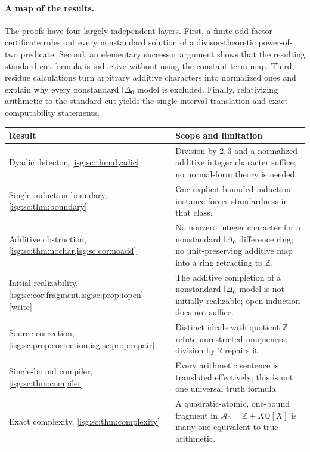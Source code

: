 \documentclass[11pt]{article}
\theoremstyle{definition}
\theoremstyle{remark}
\newcommand{\Z}{\mathbb{Z}}
\newcommand{\Q}{\mathbb{Q}}
\newcommand{\Idelta}{\mathsf{I}\Delta_0}
\newcommand{\Asc}{\mathcal{A}}
\begin{document}
\paragraph{A map of the results.} The proofs have four largely
independent layers. First, a finite odd-factor certificate rules out every
nonstandard solution of a divisor-theoretic power-of-two predicate.
Second, an elementary successor argument shows that the resulting
standard-cut formula is inductive without using the constant-term map.
Third, residue calculations turn arbitrary additive characters into
normalized ones and explain why every nonstandard $\Idelta$ model is
excluded. Finally, relativizing arithmetic to the standard cut yields the
single-interval translation and exact computability statements.
\begin{center}\small
\begin{tabular}{@{}>{\raggedright\arraybackslash}p{}>{\raggedright\arraybackslash}p{}@{}}
\toprule
Result & Scope and limitation\\
\midrule
Dyadic detector, \cref{isg:sc:thm:dyadic} & Division by $2,3$ and a
normalized additive integer character suffice; no normal-form theory is
needed.\\
Single induction boundary, \cref{isg:sc:thm:boundary} & One explicit
bounded induction instance forces standardness in that class.\\
Additive obstruction, \cref{isg:sc:thm:nochar,isg:sc:cor:noadd} & No
nonzero integer character for a nonstandard $\Idelta$ difference ring; no
unit-preserving additive map into a ring retracting to $\Z$.\\
Initial realizability, \cref{isg:sc:cor:fragment,isg:sc:prop:iopen}
\textup{[write]} & The additive completion of a nonstandard $\Idelta$
model is not initially realizable; open induction does not suffice.\\
Source correction, \cref{isg:sc:prop:correction,isg:sc:prop:repair} &
Distinct ideals with quotient $\Z$ refute unrestricted uniqueness;
division by $2$ repairs it.\\
Single-bound compiler, \cref{isg:sc:thm:compiler} & Every arithmetic
sentence is translated effectively; this is not one universal truth
formula.\\
Exact complexity, \cref{isg:sc:thm:complexity} & A quadratic-atomic,
one-bound fragment in $\Asc_0=\Z+X\Q[X]$ is many-one equivalent to true
arithmetic.\\
\bottomrule
\end{tabular}
\end{center}
\end{document}
